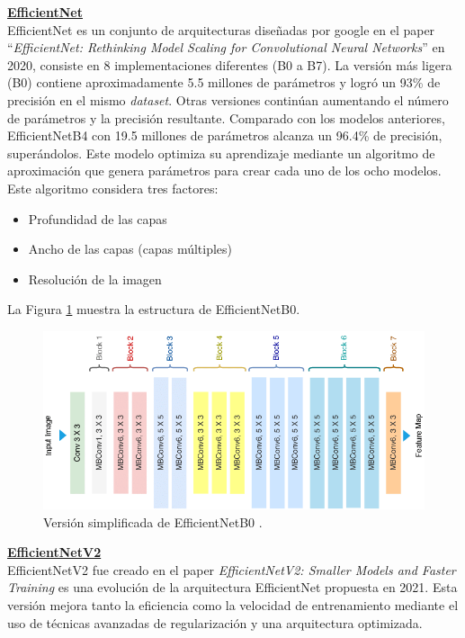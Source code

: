 \textbf{\underline{EfficientNet}} \\

EfficientNet es un conjunto de arquitecturas diseñadas por 
google en el paper ``\textit{EfficientNet: Rethinking Model Scaling for 
Convolutional Neural Networks}'' \cite{Tan2020} en 2020, 
consiste en 8 implementaciones diferentes (B0 a B7).
La versión más ligera (B0) contiene aproximadamente 5.5 
millones de parámetros y logró un 93\% de precisión en el 
mismo \textit{dataset}. Otras versiones continúan aumentando 
el número de parámetros y la precisión resultante. Comparado 
con los modelos anteriores, EfficientNetB4 con 19.5 millones 
de parámetros alcanza un 96.4\% de precisión, superándolos.
Este modelo optimiza su aprendizaje mediante un algoritmo de 
aproximación que genera parámetros para crear cada uno de 
los ocho modelos. Este algoritmo considera tres factores:
\begin{itemize} 
    \item Profundidad de las capas 
    \item Ancho de las capas (capas múltiples) 
    \item Resolución de la imagen 
\end{itemize} 

La Figura \ref{EfficientNetB0} muestra la estructura de 
EfficientNetB0.\\

\begin{figure}[h!] 
    \includegraphics[width=1\textwidth]{images/EfficientNetB0.png} 
    \centering 
    \caption[Versión simplificada de EfficientNetB0.]
    {Versión simplificada de EfficientNetB0 \protect \cite{EfficientNetB0}.}
    \label{EfficientNetB0} 
\end{figure}

\textbf{\underline{EfficientNetV2}} \\

EfficientNetV2 fue creado en el paper \textit{EfficientNetV2: Smaller Models 
and Faster Training} \cite{Tan2021} es una evolución de la arquitectura 
EfficientNet propuesta en 2021. Esta versión mejora tanto la eficiencia 
como la velocidad de entrenamiento mediante el uso de técnicas avanzadas 
de regularización y una arquitectura optimizada.\\


